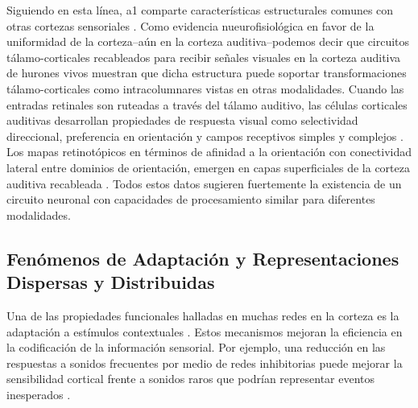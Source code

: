 Siguiendo en esta línea, \gls{a1} comparte características estructurales comunes con otras cortezas sensoriales \cite{huang_2000, winer_1992, rockel_1980, mitani_1985, mitani_1985A}. Como evidencia nueurofisiológica en favor de la uniformidad de la corteza--aún en la corteza auditiva--podemos decir que circuitos tálamo-corticales recableados para recibir señales visuales en la corteza auditiva de hurones vivos muestran que dicha estructura puede soportar transformaciones tálamo-corticales como intracolumnares vistas en otras modalidades. Cuando las entradas retinales son ruteadas a través del tálamo auditivo, las células corticales auditivas desarrollan propiedades de respuesta visual como selectividad direccional, preferencia en orientación y campos receptivos simples y complejos \cite{sur_1988, angelucci_1998, roe_1992}. Los mapas retinotópicos en términos de afinidad a la orientación con conectividad lateral entre dominios de orientación, emergen en capas superficiales de la corteza auditiva recableada \cite{roe_1990, sur_2000}. Todos estos datos sugieren fuertemente la existencia de un circuito neuronal con capacidades de procesamiento similar para diferentes modalidades. 






\subsection{Fenómenos de Adaptación y Representaciones Dispersas y Distribuidas}

Una de las propiedades funcionales halladas en muchas redes en la corteza es la adaptación a estímulos contextuales \cite{KRAUSE201436,doi:10.1167/16.13.1}. Estos mecanismos mejoran la eficiencia en la codificación de la información sensorial. Por ejemplo, una reducción en las respuestas a sonidos frecuentes por medio de redes inhibitorias puede mejorar la sensibilidad cortical frente a sonidos raros que podrían representar eventos inesperados \cite{Natan2015ComplementaryCO,nachum_2003,Javitt11962}.

